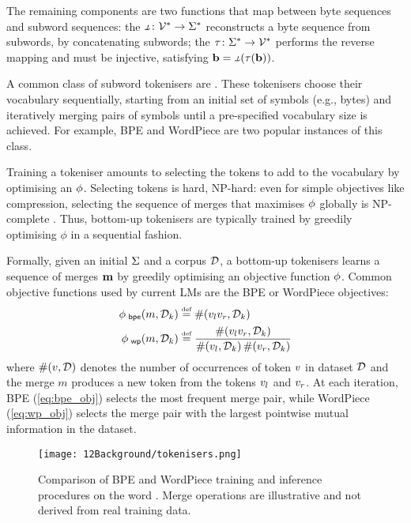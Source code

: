 The remaining components are two functions that map between byte sequences and subword sequences: the  $\detok\colon \vocab^* \to \alphabet^*$ reconstructs a byte sequence from subwords, by concatenating subwords; the  $\tau\colon \Sigma^* \to \mathcal{V}^*$ performs the reverse mapping and must be injective, satisfying $\chvec = \detok(\tok(\chvec))$.

A common class of subword tokenisers are . These tokenisers choose their vocabulary sequentially, starting from an initial set of symbols (e.g., bytes) and iteratively merging pairs of symbols until a pre-specified vocabulary size is achieved. For example, BPE \citep{gage1994new, sennrich-etal-2016-neural} and WordPiece \citep{schuster-nakajima-2012-voice} are two popular instances of this class.

Training a tokeniser amounts to selecting the tokens to add to the vocabulary by optimising an  $\phi$. Selecting tokens is hard, NP-hard: even for simple objectives like compression, selecting the sequence of merges that maximises $\phi$ globally is NP-complete \citep{kozma-etal-2024-theoretical, whittington2024tokenisation}. Thus, bottom-up tokenisers are typically trained by greedily optimising $\phi$ in a sequential fashion.

Formally, given an initial $\Sigma$ and a corpus $\mathcal{D}$, a bottom-up tokenisers learns a sequence of merges $\mathbf{m}$ by greedily optimising an objective function $\phi$. Common objective functions used by current LMs are the BPE or WordPiece objectives:
\begin{align}
    \bpeob(\merge, \dataset_k) &\defeq 
    \countfn(\lefttoken \righttoken, \dataset_k) \label{eq:bpe_obj} \\
     \wpob(\merge, \dataset_k) &\defeq 
    \frac{
    \countfn(\lefttoken \righttoken, \dataset_k)}{\countfn(\lefttoken, \dataset_k)\,\countfn(\righttoken, \dataset_k)} \label{eq:wp_obj}
\end{align}
where $\#(v, \mathcal{D})$ denotes the number of occurrences of token $v$ in dataset $\mathcal{D}$ and the merge $m$ produces a new token from the tokens $v_l$ and $v_r$. At each iteration, BPE (\cref{eq:bpe_obj}) selects the most frequent merge pair, while WordPiece (\cref{eq:wp_obj}) selects the merge pair with the largest pointwise mutual information in the dataset.

\begin{figure}[t]
    \centering
    \texttt{[image: 12Background/tokenisers.png]}
    \caption{Comparison of BPE and WordPiece training and inference procedures on the word . Merge operations are illustrative and not derived from real training data.}
    \label{fig:12-tokenisers}
\end{figure}

